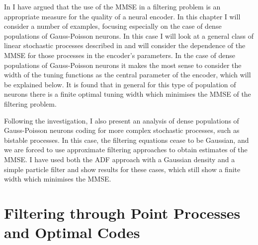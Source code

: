 
In  I have argued that the use of the MMSE in a filtering problem is an appropriate measure for the quality of a neural encoder. In this chapter I
will consider a number of examples, focusing especially on the case of dense populations of Gauss-Poisson neurons. In this case I will look at a general class of
linear stochastic processes described in  and will consider the dependence of the MMSE for those processes in the encoder's 
parameters. In the case of dense populations of Gauss-Poisson neurons it makes the most sense to consider the width of the tuning functions as the central parameter 
of the encoder, which will be explained below. It is found that in general for this type of population of neurons there is a finite optimal tuning width which minimises the
MMSE of the filtering problem.\par

Following the investigation, I also present an analysis of dense populations of Gauss-Poisson neurons coding for more complex stochastic processes, such as bistable
processes. In this case, the filtering equations cease to be Gaussian, and we are forced to use approximate filtering approaches to obtain estimates of the MMSE.
I have used both the ADF approach with a Gaussian density and a simple particle filter and show results for these cases, which still show a finite width which minimises
the MMSE.\par

\section{Filtering through Point Processes and Optimal Codes}

